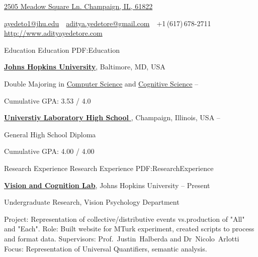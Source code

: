 \documentclass[letterpaper,MMMyyyy,nonstopmode,14pt]{simpleresumecv}
\newcommand{\CVAuthor}{Aditya Yedetore}
\newcommand{\CVWebpage}{http://www.adityayedetore.com}
\begin{document}

\Title{\CVAuthor}

\begin{SubTitle}
\href{https://www.google.com/maps/place/2505+Meadow+Square+Ln,+Champaign,+IL+61822}
{2505 Meadow Square Ln. Champaign, IL, 61822}
\par
\href{mailto:ayedeto1@jhu.edu}
{ayedeto1@jhu.edu}
\,\SubBulletSymbol\,
\href{mailto:aditya.yedetore@gmail.com}
{aditya.yedetore@gmail.com}
\,\SubBulletSymbol\,
+1\,(617)\,678-2711
\,\SubBulletSymbol\,
\href{\CVWebpage}
{\url{\CVWebpage}}
\end{SubTitle}

\begin{Body}


\Section
{Education}
{Education}
{PDF:Education}

\Entry
\href{https://www.jhu.edu}
{\textbf{Johns Hopkins University}},
Baltimore, MD, USA

\Gap
\BulletItem
Double Majoring in 
\href{https://www.cs.jhu.edu}
{Computer Science}
and 
\href{https://cogsci.jhu.edu}
{Cognitive Science}
\hfill
{} -- 

\begin{Detail}
	\SubBulletItem
	Cumulative GPA: 3.53 / 4.0
\end{Detail}

\BigGap
\Entry
\href{http://www.uni.illinois.edu}
{\textbf{Universtiy Laboratory High School }},
Champaign, Illinois, USA
\hfill
{} --

\Gap
\BulletItem
General High School Diploma
\begin{Detail}

\SubBulletItem
Cumulative GPA: 4.00 / 4.00
\end{Detail}

\Section
{Research Experience}
{Research Experience}
{PDF:ResearchExperience}

\Entry
\href{http://www.example.com/my-institute}
{\textbf{Vision and Cognition Lab}},
Johns Hopkins University 
\hfill
{} --
Present

\Gap
\BulletItem
Undergraduate Research, Vision Psychology Department
\begin{Detail}
	\SubBulletItem
	Project:
	Representation of collective/distributive events vs.production of "All" and "Each".
	\SubBulletItem
	Role:
    Built website for MTurk experiment, created scripts to process and format data.
	\SubBulletItem
	Supervisors:
	Prof.~Justin~Halberda and
	Dr~Nicolo~Arlotti
	\SubBulletItem
	Focus:
	Representation of Universal Quantifiers, semantic analysis. 
\end{Detail}


\end{Body}
\end{document}
